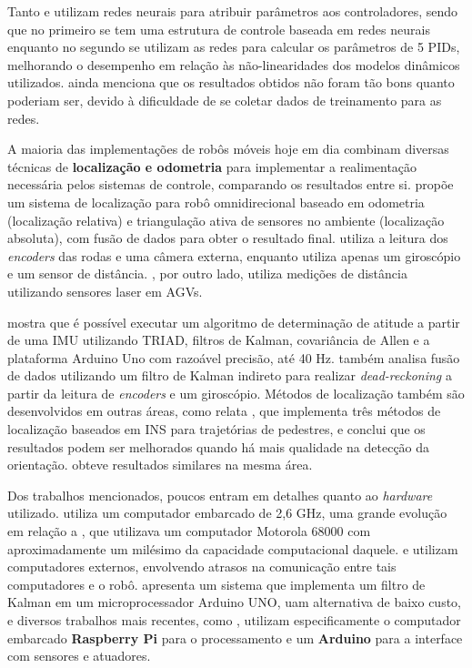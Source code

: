 Tanto \cite{treesatayapun2011discrete} e \cite{oubbati2005velocity} utilizam redes neurais para atribuir parâmetros aos controladores, sendo que no primeiro se tem uma estrutura de controle baseada em redes neurais enquanto no segundo se utilizam as redes para calcular os parâmetros de 5 PIDs, melhorando o desempenho em relação às não-linearidades dos modelos dinâmicos utilizados. \cite{oubbati2005velocity} ainda menciona que os resultados obtidos não foram tão bons quanto poderiam ser, devido à dificuldade de se coletar dados de treinamento para as redes.

A maioria das implementações de robôs móveis hoje em dia combinam diversas técnicas de \textbf{localização e odometria} para implementar a realimentação necessária pelos sistemas de controle, comparando os resultados entre si. \cite{ginzburg2013indoor} propõe um sistema de localização para robô omnidirecional baseado em odometria (localização relativa) e triangulação ativa de sensores no ambiente (localização absoluta), com fusão de dados para obter o resultado final. \cite{rojas2006holonomic} utiliza a leitura dos \emph{encoders} das rodas e uma câmera externa, enquanto \cite{garcia2015gyro} utiliza apenas um giroscópio e um sensor de distância. \cite{rohrig2010laser}, por outro lado, utiliza medições de distância utilizando sensores laser em AGVs.

\cite{lowcostIMU} mostra que é possível executar um algoritmo de determinação de atitude a partir de uma IMU utilizando TRIAD, filtros de Kalman, covariância de Allen e a plataforma Arduino Uno com razoável precisão, até 40 Hz. \cite{park1996dead} também analisa fusão de dados utilizando um filtro de Kalman indireto para realizar \emph{dead-reckoning} a partir da leitura de \emph{encoders} e um giroscópio. Métodos de localização também são desenvolvidos em outras áreas, como relata \cite{jimenez2009comparison}, que implementa três métodos de localização baseados em INS para trajetórias de pedestres, e conclui que os resultados podem ser melhorados quando há mais qualidade na detecção da orientação. \cite{steinhoff2010pocket} obteve resultados similares na mesma área.

Dos trabalhos mencionados, poucos entram em detalhes quanto ao \emph{hardware} utilizado. \cite{oubbati2005velocity} utiliza um computador embarcado de 2,6 GHz, uma grande evolução em relação a \cite{feng1989servo}, que utilizava um computador Motorola 68000 com aproximadamente um milésimo da capacidade computacional daquele. \cite{takemura2007development} e \cite{loh2003mechatronics} utilizam computadores externos, envolvendo atrasos na comunicação entre tais computadores e o robô. \cite{lowcostIMU} apresenta um sistema que implementa um filtro de Kalman em um microprocessador Arduino UNO, uam alternativa de baixo custo, e diversos trabalhos mais recentes, como \cite{krinkin2015design}, utilizam especificamente o computador embarcado \textbf{Raspberry Pi} para o processamento e um \textbf{Arduino} para a interface com sensores e atuadores.
